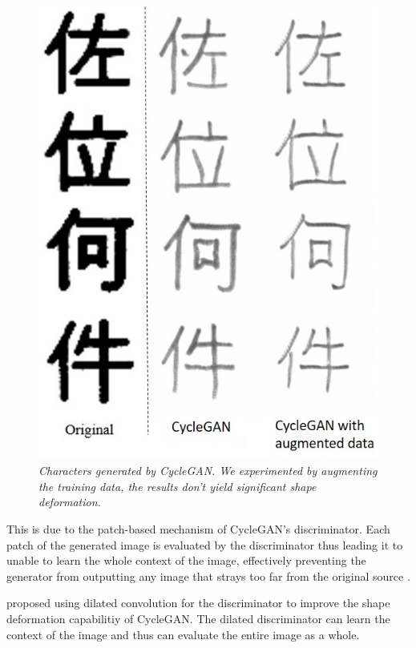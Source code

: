\documentclass[12pt]{report}
\begin{document}
\begin{figure}[H]
	\centering
	\includegraphics[scale=0.7]{kanji-example}
	\caption{\textit{Characters generated by CycleGAN. We experimented by augmenting the training data, the results don't yield significant shape deformation.}}
	\label{fig:kanji-example}
\end{figure}


This is due to the patch-based mechanism of CycleGAN's discriminator. Each patch of the generated image is evaluated by the discriminator thus leading it to unable to learn the whole context of the image, effectively preventing the generator from outputting any image that strays too far from the original source \cite{ganimorph}.

\cite{ganimorph} proposed using dilated convolution for the discriminator to improve the shape deformation capabilitiy of CycleGAN. The dilated discriminator can learn the context of the image and thus can evaluate the entire image as a whole. 
\end{document}
